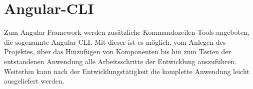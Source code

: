 
\section{Angular-CLI}

Zum Angular Framework werden zusätzliche Kommandozeilen-Tools angeboten, die sogenannte Angular-CLI. Mit dieser ist es möglich, vom Anlegen des Projektes, über das Hinzufügen von Komponenten bis hin zum Testen der entstandenen Anwendung alle Arbeitsschritte der Entwicklung auszuführen. Weiterhin kann nach der Entwicklungstätigkeit die komplette Anwendung leicht ausgeliefert werden.
\cite{angularIO}
